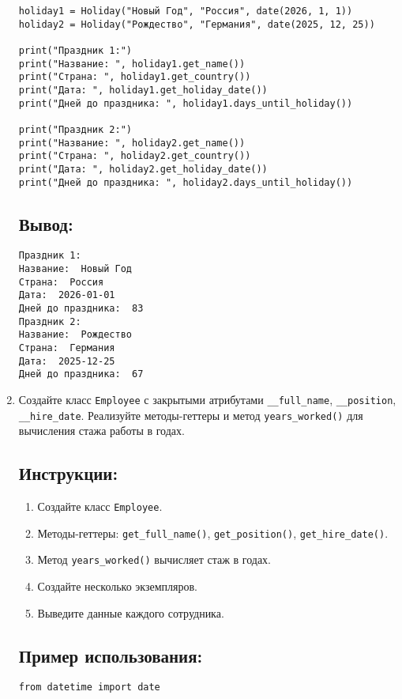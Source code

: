 \begin{enumerate}
\begin{lstlisting}[caption=Пример кода]
holiday1 = Holiday("Новый Год", "Россия", date(2026, 1, 1))
holiday2 = Holiday("Рождество", "Германия", date(2025, 12, 25))

print("Праздник 1:")
print("Название: ", holiday1.get_name())
print("Страна: ", holiday1.get_country())
print("Дата: ", holiday1.get_holiday_date())
print("Дней до праздника: ", holiday1.days_until_holiday())

print("Праздник 2:")
print("Название: ", holiday2.get_name())
print("Страна: ", holiday2.get_country())
print("Дата: ", holiday2.get_holiday_date())
print("Дней до праздника: ", holiday2.days_until_holiday())
\end{lstlisting}

\subsection*{Вывод:}
\begin{lstlisting}[caption=Ожидаемый вывод]
Праздник 1:
Название:  Новый Год
Страна:  Россия
Дата:  2026-01-01
Дней до праздника:  83
Праздник 2:
Название:  Рождество
Страна:  Германия
Дата:  2025-12-25
Дней до праздника:  67
\end{lstlisting}
\item
Создайте класс \texttt{Employee} с закрытыми атрибутами \texttt{\_\_full\_name}, \texttt{\_\_position}, \texttt{\_\_hire\_date}. Реализуйте методы-геттеры и метод \texttt{years\_worked()} для вычисления стажа работы в годах.

\subsection*{Инструкции:}
\begin{enumerate}
    \item Создайте класс \texttt{Employee}.
    \item Методы-геттеры: \texttt{get\_full\_name()}, \texttt{get\_position()}, \texttt{get\_hire\_date()}.
    \item Метод \texttt{years\_worked()} вычисляет стаж в годах.
    \item Создайте несколько экземпляров.
    \item Выведите данные каждого сотрудника.
\end{enumerate}

\subsection*{Пример использования:}
\begin{lstlisting}[caption=Пример кода]
from datetime import date


\end{lstlisting}
\end{enumerate}
